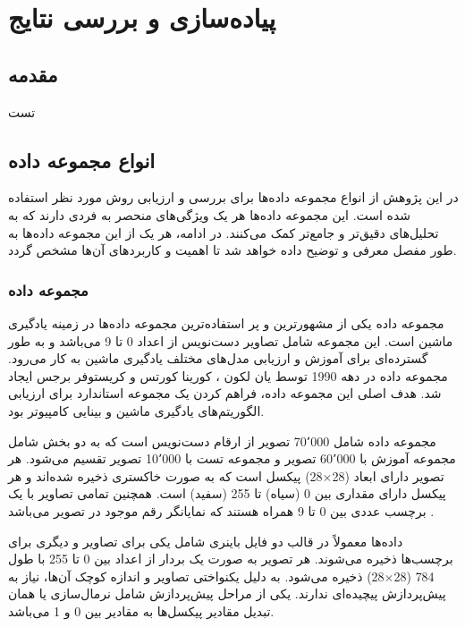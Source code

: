 \chapter{پیاده‌سازی و بررسی نتایج}

\section{مقدمه}
تست


\section{انواع مجموعه داده}
در این پژوهش از انواع مجموعه داده‌ها برای بررسی و ارزیابی روش مورد نظر استفاده شده است. این مجموعه داده‌ها هر یک ویژگی‌های منحصر به فردی دارند که به تحلیل‌های دقیق‌تر و جامع‌تر کمک می‌کنند. در ادامه، هر یک از این مجموعه داده‌ها به طور مفصل معرفی و توضیح داده خواهد شد تا اهمیت و کاربردهای آن‌ها مشخص گردد.

\subsection{
مجموعه داده
}
مجموعه داده
یکی از مشهورترین و پر استفاده‌ترین مجموعه داده‌ها در زمینه یادگیری ماشین است. این مجموعه شامل تصاویر دست‌نویس از اعداد 0 تا 9 می‌باشد و به طور گسترده‌ای برای آموزش و ارزیابی مدل‌های مختلف یادگیری ماشین به کار می‌رود.
مجموعه داده
در دهه 1990 توسط یان لکون%
،
کورینا کورتس
و کریستوفر برجس%
 ایجاد شد. هدف اصلی این مجموعه داده، فراهم کردن یک مجموعه استاندارد برای ارزیابی الگوریتم‌های یادگیری ماشین و بینایی کامپیوتر بود.

مجموعه داده
شامل 70٬000 تصویر از ارقام دست‌نویس است که به دو بخش شامل مجموعه آموزش با 60٬000 تصویر و مجموعه تست با 10٬000 تصویر تقسیم می‌شود. هر تصویر دارای ابعاد
(28$\times$28)
پیکسل است که به صورت خاکستری%
ذخیره شده‌اند و هر پیکسل دارای مقداری بین 0 (سیاه) تا 255 (سفید) است. همچنین تمامی تصاویر با یک برچسب عددی بین 0 تا 9 همراه هستند که نمایانگر رقم موجود در تصویر می‌باشد
\cite{lecun1998gradient}.

داده‌ها معمولاً در قالب دو فایل باینری شامل یکی برای تصاویر و دیگری برای برچسب‌ها ذخیره می‌شوند. هر تصویر به صورت یک بردار از اعداد بین 0 تا 255 با طول 784
(28$\times$28)
ذخیره می‌شود. به دلیل یکنواختی تصاویر و اندازه کوچک آن‌ها، نیاز به پیش‌پردازش پیچیده‌ای ندارند. یکی از مراحل پیش‌پردازش شامل نرمال‌سازی یا همان تبدیل مقادیر پیکسل‌ها به مقادیر بین 0 و 1 می‌باشد.

